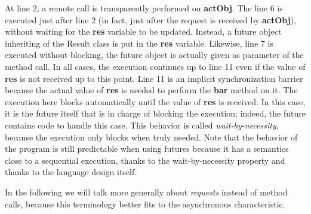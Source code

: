 \documentclass[11pt]{report}
\begin{document}
At line 2, a remote call is transparently performed on \textbf{actObj}. The line 6 is executed just after line 2 (in fact, just after the request is received by \textbf{actObj}), without waiting for the \textbf{res} variable to be updated. Instead, a future object inheriting of the Result class is put in the \textbf{res} variable. Likewise, line 7 is executed without blocking, the future object is actually given as parameter of the method call. In all cases, the execution continues up to line 11 even if the value of \textbf{res} is not received up to this point. Line 11 is an implicit synchronization barrier because the actual value of \textbf{res} is needed to perform the \textbf{bar} method on it. The execution here blocks automatically until the value of \textbf{res} is received. In this case, it is the future itself that is in charge of blocking the execution; indeed, the future contains code to handle this case. This behavior is called \emph{wait-by-necessity}, because the execution only blocks when truly needed. 
Note that the behavior of the program is still predictable when using futures because it has a semantics close to a sequential execution, thanks to the wait-by-necessity property and thanks to the language design itself. 

In the following we will talk more generally about \emph{requests} instead of method calls, because this terminology better fits to the asynchronous characteristic.
\end{document}

